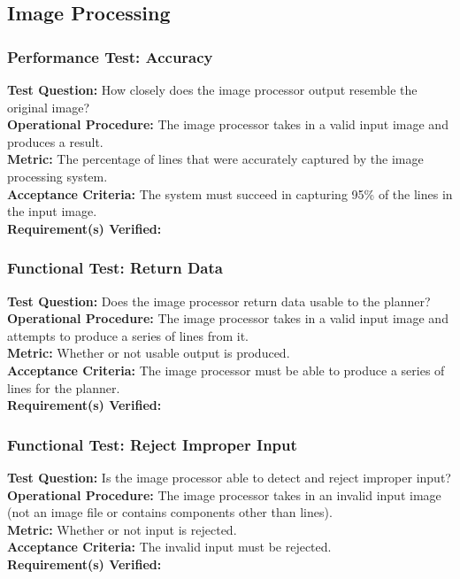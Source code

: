 
\subsection{Image Processing}
\label{sec:verification_image}

\subsubsection{Performance Test: Accuracy}
\label{test:image_pt_accuracy}
\textbf{Test Question:} How closely does the image processor output resemble the original image?\\
\textbf{Operational Procedure:} The image processor takes in a valid input image  and produces a result.\\
\textbf{Metric:} The percentage of lines that were accurately captured by the image processing system.\\
\textbf{Acceptance Criteria:} The system must succeed in capturing 95\% of the lines in the input image.\\
\textbf{Requirement(s) Verified:} 

\subsubsection{Functional Test: Return Data}
\label{test:image_ft_data}
\textbf{Test Question:} Does the image processor return data usable to the planner?\\
\textbf{Operational Procedure:} The image processor takes in a valid input image  and attempts to produce a series of lines from it.\\
\textbf{Metric:} Whether or not usable output is produced.\\
\textbf{Acceptance Criteria:} The image processor must be able to produce a series of lines for the planner.\\
\textbf{Requirement(s) Verified:} 

\subsubsection{Functional Test: Reject Improper Input}
\label{test:image_ft_reject}
\textbf{Test Question:} Is the image processor able to detect and reject improper input?\\
\textbf{Operational Procedure:} The image processor takes in an invalid input image (not an image file or contains components other than lines). \\
\textbf{Metric:} Whether or not input is rejected.\\
\textbf{Acceptance Criteria:} The invalid input must be rejected.\\
\textbf{Requirement(s) Verified:} 

